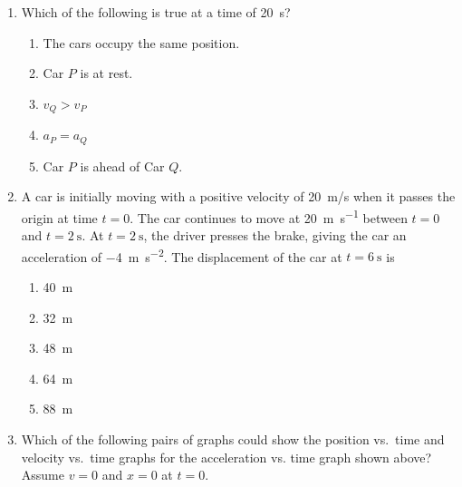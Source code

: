 \documentclass{../../../oss-classkick}
\begin{document}
\begin{multicols*}{2}
\begin{enumerate}[resume,leftmargin=18pt]
  \item Which of the following is true at a time of \SI{20}{\second}?
    \begin{enumerate}[nosep,leftmargin=18pt,label=(\Alph*)]
    \item The cars occupy the same position.
    \item Car $P$ is at rest.
    \item $v_Q>v_P$
    \item $a_P=a_Q$
    \item Car $P$ is ahead of Car $Q$.
    \end{enumerate}
    \label{q:graph2}
    \vspace{.7in}
    
  \item A car is initially moving with a positive velocity of \SI{20}{m/s} when
    it passes the origin at time $t=0$. The car continues to move at
    \SI{20}{\metre\per\second} between $t=0$ and $t=\SI{2}{\second}$. At
    $t=\SI{2}{\second}$, the driver presses the brake, giving the car an
    acceleration of \SI{-4}{\metre\per\second^2}. The displacement of the car
    at $t=\SI{6}{\second}$ is
    \begin{enumerate}[nosep,leftmargin=18pt,label=(\Alph*)]
    \item\SI{40}{\metre}
    \item\SI{32}{\metre}
    \item\SI{48}{\metre}
    \item\SI{64}{\metre}
    \item\SI{88}{\metre}
    \end{enumerate}
    
  \item Which of the following pairs of graphs could show the position vs.\
    time and velocity vs.\ time graphs for the acceleration vs. time graph
    shown above? Assume $v=0$ and $x=0$ at $t=0$.
    \begin{center}
    \end{center}
    \vspace{.7in}
    

\end{enumerate}
\end{multicols*}
\end{document}
